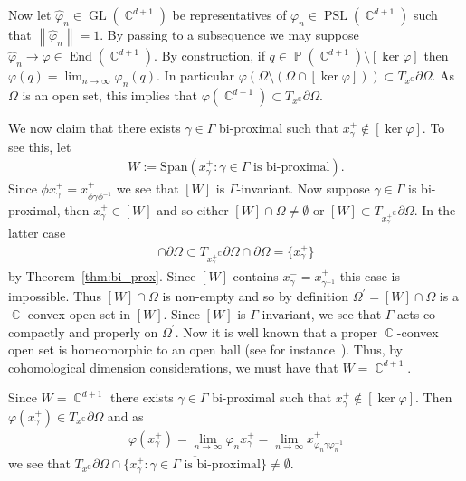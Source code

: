 \documentclass[12pt]{amsart}
\theoremstyle{plain}
\theoremstyle{definition}
\theoremstyle{remark}
\begin{document}
Now let $\hat{\varphi}_n \in \operatorname{GL}(\operatorname{\mathbb{C}}^{d+1})$ be representatives of $\varphi_n \in \operatorname{PSL}(\operatorname{\mathbb{C}}^{d+1})$ such that ${\left\|{\hat{\varphi}_n}\right\|}=1$. By passing to a subsequence we may suppose $\hat{\varphi}_n \rightarrow \varphi \in \operatorname{End}(\operatorname{\mathbb{C}}^{d+1})$. By construction, if $q \in \operatorname{\mathbb{P}}(\operatorname{\mathbb{C}}^{d+1})\setminus [\ker \varphi]$ then $\varphi(q) = \lim_{n \rightarrow \infty} \varphi_n (q)$.  In particular $\varphi(\Omega \setminus (\Omega \cap [\ker \varphi])) \subset T_x^\operatorname{\mathbb{C}} \partial \Omega$.  As $\Omega$ is an open set, this implies that $\varphi(\operatorname{\mathbb{C}}^{d+1}) \subset T_x^\operatorname{\mathbb{C}} \partial \Omega$.  

We now claim that there exists $\gamma \in \Gamma$ bi-proximal such that $x^+_{\gamma} \notin [\ker \varphi]$. To see this, let
\begin{align*}
W:=\textrm{Span}(  x^+_{\gamma} : \gamma \in \Gamma \text{ is bi-proximal} ).
\end{align*}
Since $\phi x^+_{\gamma} = x^+_{\phi \gamma \phi^{-1}}$ we see that $[W]$ is $\Gamma$-invariant. Now suppose $\gamma \in \Gamma$ is bi-proximal, then $x^+_{\gamma} \in [W]$ and so either $[W] \cap \Omega \neq \emptyset$ or $[W] \subset T_{x^+_{\gamma}}^\operatorname{\mathbb{C}} \partial \Omega$. In the latter case
\begin{align*}
[W] \cap \partial \Omega \subset T_{x^+_{\gamma}}^\operatorname{\mathbb{C}} \partial \Omega \cap \partial \Omega = \{x^+_{\gamma}\}
\end{align*}
by Theorem~\ref{thm:bi_prox}. Since $[W]$ contains $x^-_{\gamma}=x^+_{\gamma^{-1}}$ this case is impossible. Thus $[W]\cap \Omega$ is non-empty and so by definition $\Omega^\prime=[W] \cap \Omega$ is a $\operatorname{\mathbb{C}}$-convex open set in $[W]$. Since $[W]$ is $\Gamma$-invariant, we see that $\Gamma$ acts co-compactly and properly on $\Omega^\prime$. Now it is well known that a proper $\operatorname{\mathbb{C}}$-convex open set is homeomorphic to an open ball (see for instance~\cite[Theorem 2.4.2]{APS2004}). Thus, by cohomological dimension considerations, we must have that $W=\operatorname{\mathbb{C}}^{d+1}$.

Since $W=\operatorname{\mathbb{C}}^{d+1}$ there exists $\gamma \in \Gamma$ bi-proximal such that $x^+_{\gamma} \notin [\ker \varphi]$. Then $\varphi(x^+_{\gamma}) \in T_x^\operatorname{\mathbb{C}} \partial \Omega$ and as 
\begin{align*}
\varphi(x^+_{\gamma}) = \lim_{n \rightarrow\infty} \varphi_n x^+_{\gamma} = \lim_{n \rightarrow\infty}  x^+_{\varphi_n \gamma \varphi_n^{-1}}
\end{align*}
 we see that $T_x^\operatorname{\mathbb{C}} \partial \Omega \cap  \overline{\{ x^+_{\gamma} : \gamma \in \Gamma \text{ is bi-proximal} \}} \neq \emptyset$. 
\end{document}
